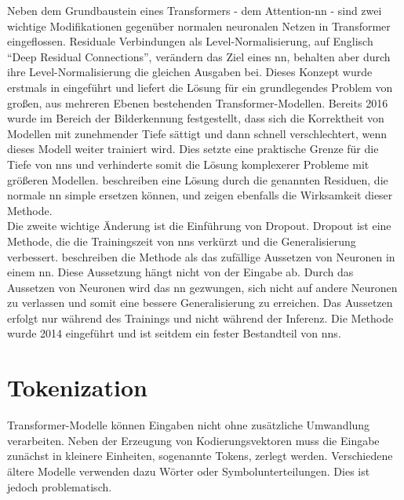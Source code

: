 Neben dem Grundbaustein eines Transformers - dem Attention-\ac{nn} - sind zwei wichtige Modifikationen gegenüber normalen neuronalen Netzen in Transformer eingeflossen.
Residuale Verbindungen als Level-Normalisierung, auf Englisch \enquote{Deep Residual Connections}, verändern das Ziel eines \ac{nn}, behalten aber durch ihre Level-Normalisierung die gleichen Ausgaben bei.
Dieses Konzept wurde erstmals in \citet{deep_residual} eingeführt und liefert die Lösung für ein grundlegendes Problem von großen, aus mehreren Ebenen bestehenden Transformer-Modellen.
Bereits 2016 wurde im Bereich der Bilderkennung festgestellt, dass sich die Korrektheit von Modellen mit zunehmender Tiefe sättigt und dann schnell verschlechtert, wenn dieses Modell weiter trainiert wird.
Dies setzte eine praktische Grenze für die Tiefe von \ac{nn}s und verhinderte somit die Lösung komplexerer Probleme mit größeren Modellen.
\citet{deep_residual} beschreiben eine Lösung durch die genannten Residuen, die normale \ac{nn} simple ersetzen können, und zeigen ebenfalls die Wirksamkeit dieser Methode.\\

Die zweite wichtige Änderung ist die Einführung von Dropout.
Dropout ist eine Methode, die die Trainingszeit von \ac{nn}s verkürzt und die Generalisierung verbessert.
\citet{dropout} beschreiben die Methode als das zufällige Aussetzen von Neuronen in einem \ac{nn}. 
Diese Aussetzung hängt nicht von der Eingabe ab.
Durch das Aussetzen von Neuronen wird das \ac{nn} gezwungen, sich nicht auf andere Neuronen zu verlassen und somit eine bessere Generalisierung zu erreichen.
Das Aussetzen erfolgt nur während des Trainings und nicht während der Inferenz.
Die Methode wurde 2014 eingeführt und ist seitdem ein fester Bestandteil von \ac{nn}s.\\

\section{Tokenization}\label{sec:tokenization}
Transformer-Modelle können Eingaben nicht ohne zusätzliche Umwandlung verarbeiten.
Neben der Erzeugung von Kodierungsvektoren muss die Eingabe zunächst in kleinere Einheiten, sogenannte Tokens, zerlegt werden.
Verschiedene ältere Modelle verwenden dazu Wörter oder Symbolunterteilungen.
Dies ist jedoch problematisch.\\

